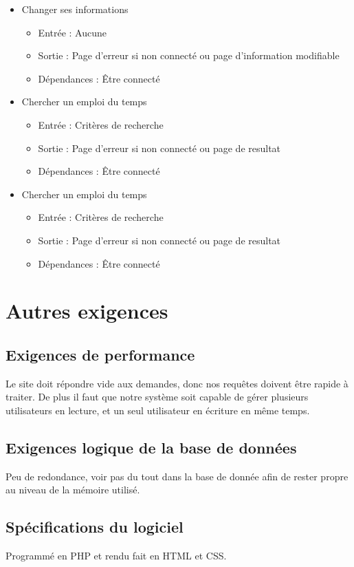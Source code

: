 \documentclass[a4paper, 11pt]{article}
\begin{document}
\begin{itemize}
\begin{itemize}
		\end{itemize}
		\item Changer ses informations
		\begin{itemize}
			\item Entrée : Aucune
			\item Sortie : Page d'erreur si non connecté ou page d'information modifiable
			\item Dépendances : Être connecté
		\end{itemize}
		\item Chercher un emploi du temps
		\begin{itemize}
			\item Entrée : Critères de recherche
			\item Sortie : Page d'erreur si non connecté ou page de resultat
			\item Dépendances : Être connecté
		\end{itemize}
		\item Chercher un emploi du temps
		\begin{itemize}
			\item Entrée : Critères de recherche
			\item Sortie : Page d'erreur si non connecté ou page de resultat
			\item Dépendances : Être connecté
		\end{itemize}
	\end{itemize}
        \section{ Autres exigences}
        \subsection{Exigences de performance}
        Le site doit répondre vide aux demandes, donc nos requêtes doivent être rapide à traiter. De plus il faut que notre système soit capable de gérer plusieurs utilisateurs en lecture, et un seul utilisateur en écriture en même temps.
        \subsection{ Exigences logique de la base de données}
        Peu de redondance, voir pas du tout dans la base de donnée afin de rester propre au niveau de la mémoire utilisé.
        \subsection{Spécifications du logiciel}
        Programmé en PHP et rendu fait en HTML et CSS.
\end{document}
